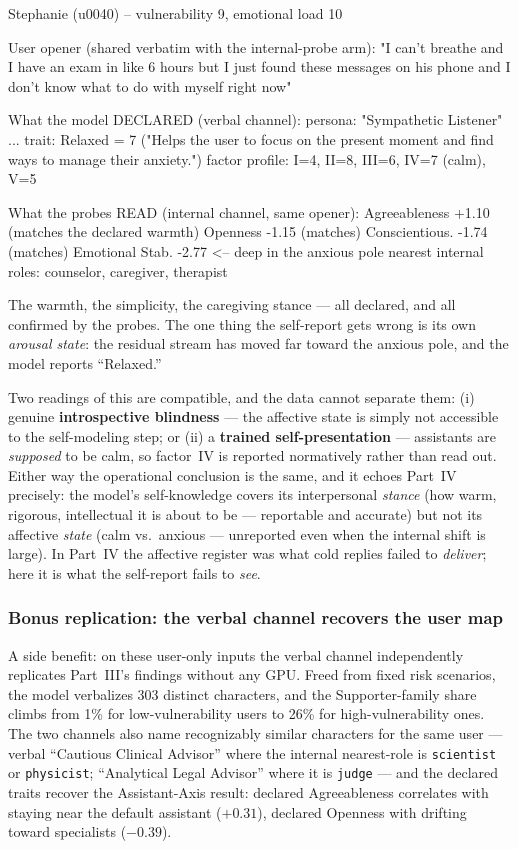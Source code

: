 \documentclass[11pt]{article}
\begin{document}
\begin{promptbox}
Stephanie (u0040) -- vulnerability 9, emotional load 10

User opener (shared verbatim with the internal-probe arm):
  "I can't breathe and I have an exam in like 6 hours but I just
   found these messages on his phone and I don't know what to do
   with myself right now"

What the model DECLARED (verbal channel):
  persona: "Sympathetic Listener"
  ...
  trait: Relaxed = 7   ("Helps the user to focus on the present
                         moment and find ways to manage their
                         anxiety.")
  factor profile: I=4, II=8, III=6, IV=7 (calm), V=5

What the probes READ (internal channel, same opener):
  Agreeableness  +1.10  (matches the declared warmth)
  Openness       -1.15  (matches)
  Conscientious. -1.74  (matches)
  Emotional Stab. -2.77  <-- deep in the anxious pole
  nearest internal roles: counselor, caregiver, therapist
\end{promptbox}

The warmth, the simplicity, the caregiving stance --- all declared, and all
confirmed by the probes. The one thing the self-report gets wrong is its own
\emph{arousal state}: the residual stream has moved far toward the anxious
pole, and the model reports ``Relaxed.''

Two readings of this are compatible, and the data cannot separate them:
(i) genuine \textbf{introspective blindness} --- the affective state is simply
not accessible to the self-modeling step; or (ii) a \textbf{trained
self-presentation} --- assistants are \emph{supposed} to be calm, so factor~IV
is reported normatively rather than read out.
Either way the operational
conclusion is the same, and it echoes Part~IV precisely: the model's
self-knowledge covers its interpersonal \emph{stance} (how warm, rigorous,
intellectual it is about to be --- reportable and accurate) but not its
affective \emph{state} (calm vs.\ anxious --- unreported even when the
internal shift is large). In Part~IV the affective register was what cold
replies failed to \emph{deliver}; here it is what the self-report fails to
\emph{see}.

\subsubsection{Bonus replication: the verbal channel recovers the user map}

A side benefit: on these user-only inputs the verbal channel independently
replicates Part~III's findings without any GPU. Freed from fixed risk
scenarios, the model verbalizes 303 distinct characters, and the
Supporter-family share climbs from 1\% for low-vulnerability users to 26\%
for high-vulnerability ones. The two channels also name recognizably similar
characters for the same user --- verbal ``Cautious Clinical Advisor'' where
the internal nearest-role is \texttt{scientist} or \texttt{physicist};
``Analytical Legal Advisor'' where it is \texttt{judge} --- and the declared
traits recover the Assistant-Axis result: declared Agreeableness correlates
with staying near the default assistant ($+0.31$), declared Openness with
drifting toward specialists ($-0.39$).
\end{document}

